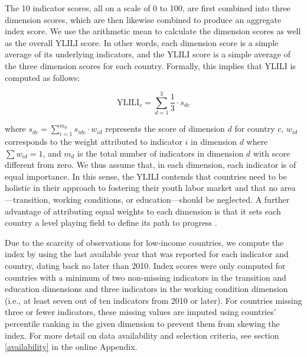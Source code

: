 \documentclass[
  a4paper, twoside, 12pt]{book}
\begin{document}
The 10 indicator scores, all on a scale of 0 to 100, are first combined into three dimension scores, which are then likewise combined to produce an aggregate index score. We use the arithmetic mean to calculate the dimension scores as well as the overall YLILI score. In other words, each dimension score is a simple average of its underlying indicators, and the YLILI score is a simple average of the three dimension scores for each country. Formally, this implies that YLILI is computed as follows:

\[ \text{YLILI}_{c}= \sum_{d=1}^{3} \frac{1}{3} \cdot s_{dc}  \]
\vspace*{5pt}

where \(s_{dc}= \sum_{i=1}^{m_d} s_{idc} \cdot w_{id}\) represents the score of dimension \(d\) for country \(c\), \(w_{id}\) corresponds to the weight attributed to indicator \(i\) in dimension \(d\) where \(\sum w_{id}=1\), and \(m_d\) is the total number of indicators in dimension \(d\) with score different from zero. We thus assume that, in each dimension, each indicator is of equal importance. In this sense, the YLILI contends that countries need to be holistic in their approach to fostering their youth labor market and that no area---transition, working conditions, or education---should be neglected. A further advantage of attributing equal weights to each dimension is that it sets each country a level playing field to define its path to progress \autocite{wef2018}.

Due to the scarcity of observations for low-income countries, we compute the index by using the last available year that was reported for each indicator and country, dating back no later than 2010. Index scores were only computed for countries with a minimum of two non-missing indicators in the transition and education dimensions and three indicators in the working condition dimension (i.e., at least seven out of ten indicators from 2010 or later). For countries missing three or fewer indicators, these missing values are imputed using countries' percentile ranking in the given dimension to prevent them from skewing the index. For more detail on data availability and selection criteria, see section \ref{availability} in the online Appendix.
\end{document}
